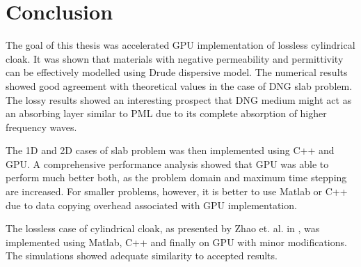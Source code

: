 \chapter{Conclusion}
The goal of this thesis was accelerated GPU implementation of lossless cylindrical cloak. It was shown that materials with negative permeability and permittivity can be effectively modelled using Drude dispersive model. The numerical results showed good agreement with theoretical values in the case of DNG slab problem. The lossy results showed an interesting prospect that DNG medium might act as an absorbing layer similar to PML due to its complete absorption of higher frequency waves.

The 1D and 2D cases of slab problem was then implemented using C++ and GPU. A comprehensive performance analysis showed that GPU was able to perform much better both, as the problem domain and maximum time stepping are increased. For smaller problems, however, it is better to use Matlab or C++ due to data copying overhead associated with GPU implementation.

The lossless case of cylindrical cloak, as presented by Zhao et. al. in \cite{Radial-Zhao}, was implemented using Matlab, C++ and finally on GPU with minor modifications. The simulations showed adequate similarity to accepted results.
